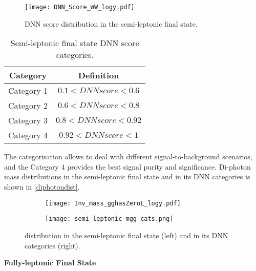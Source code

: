 {\begin{figure}[h]
	\centering
	\texttt{[image: DNN\_Score\_WW\_logy.pdf]}
	\vspace{2mm}
	\caption{DNN score distribution in the semi-leptonic final state.}
\label{dnnscore1}
\end{figure}

\begin{table}[h]
    \centering
    \caption{Semi-leptonic final state DNN score categories.}
    \begin{tabular}{ c c }
    \hline
    Category & Definition \\
    \hline
    Category 1 & $0.1 < DNN score < 0.6 $ \\
    Category 2 & $0.6 < DNN score < 0.8 $ \\
    Category 3 & $0.8 < DNN score < 0.92 $ \\
    Category 4 & $0.92 < DNN score < 1 $ \\
    \hline
    \end{tabular}
    \label{hasOneL_dnncategories}
\end{table}

The categorisation allows to deal with different signal-to-background scenarios, and the Category 4 provides the best signal purity and significance. Di-photon mass distributions in the semi-leptonic final state and in its DNN categories is shown in \autoref{diphotondist}.

\begin{figure*}[h!]
    \centering
    \begin{subfigure}[b]{0.475\textwidth}
        \centering
        \texttt{[image: Inv\_mass\_gghasZeroL\_logy.pdf]}
        \vspace{0.1cm}
    \end{subfigure}
    \hspace{0.2cm}
    \begin{subfigure}[b]{0.475\textwidth}  
        \centering 
        \texttt{[image: semi-leptonic-mgg-cats.png]}
        \vspace{0.1cm}
    \end{subfigure}
    \caption[]
    {\small \mgg distribution in the semi-leptonic final state (left) and in its DNN categories (right).}
    \label{diphotondist}
\end{figure*}

\textbf{Fully-leptonic Final State}

}
